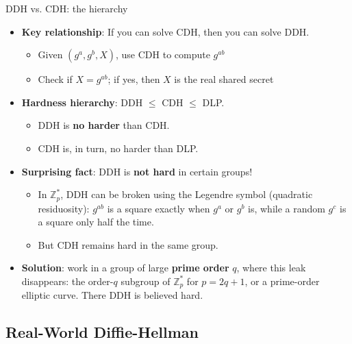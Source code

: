 \ifdefined\PRESENTATION\else\PassOptionsToClass{handout}{beamer}\fi\documentclass[aspectratio=169, lualatex]{beamer}
\begin{document}
\begin{frame}{DDH vs. CDH: the hierarchy}
	\begin{itemize}[<+->]
		\item \textbf{Key relationship}: If you can solve CDH, then you can solve DDH.
		      \begin{itemize}
			      \item Given $(g^a, g^b, X)$, use CDH to compute $g^{ab}$
			      \item Check if $X = g^{ab}$; if yes, then $X$ is the real shared secret
		      \end{itemize}
		\item \textbf{Hardness hierarchy}: DDH $\leq$ CDH $\leq$ DLP.
		      \begin{itemize}
			      \item DDH is \textbf{no harder} than CDH.
			      \item CDH is, in turn, no harder than DLP.
		      \end{itemize}
		\item \textbf{Surprising fact}: DDH is \textbf{not hard} in certain groups!
		      \begin{itemize}
			      \item In $\mathbb{Z}_p^*$, DDH can be broken using the Legendre symbol (quadratic residuosity): $g^{ab}$ is a square exactly when $g^a$ or $g^b$ is, while a random $g^c$ is a square only half the time.
			      \item But CDH remains hard in the same group.
		      \end{itemize}
		\item \textbf{Solution}: work in a group of large \textbf{prime order} $q$, where this leak disappears: the order-$q$ subgroup of $\mathbb{Z}_p^*$ for $p = 2q + 1$, or a prime-order elliptic curve. There DDH is believed hard.
	\end{itemize}
\end{frame}

\subsection{Real-World Diffie-Hellman}
\end{document}
